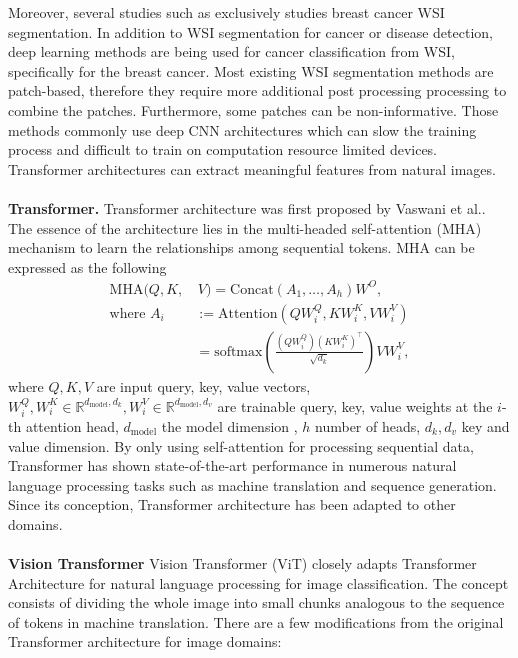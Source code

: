 \documentclass[review]{cvpr}
\begin{document}
Moreover, several studies such as \cite{Guofast2020} exclusively studies breast cancer WSI segmentation. In addition to WSI segmentation for cancer or disease detection, deep learning methods are being used for cancer classification from WSI\cite{XU2014591}, specifically for the  breast cancer. Most existing WSI segmentation methods are patch-based, therefore they require more additional post processing processing to combine the patches. Furthermore, some patches can be non-informative. Those methods commonly use deep CNN architectures which can slow the training process and difficult to train on computation resource limited devices. Transformer architectures can extract meaningful features from natural images. \\
\\
\textbf{Transformer.} Transformer architecture was first proposed by Vaswani et al.\cite{vaswani2017attention}. The essence of the architecture lies in the multi-headed self-attention (MHA) mechanism to learn the relationships among sequential tokens. MHA can be expressed as the following
\begin{equation}
\begin{split}
    \text{MHA}(Q, K,&\, V) =  \text{Concat}(A_1, \dots, A_h)W^O, \\[3mm]
    \text{where } A_i & := \text{Attention}(QW_i^Q, KW_i^K, VW_i^V) \\
        & = \text{softmax} \left( \frac{(QW_i^Q)(KW_i^K)^\top}{\sqrt{d_k}} \right) VW_i^V,
    \label{attention}
\end{split}
\end{equation}
where $Q, K, V$ are input query, key, value vectors, $W_i^Q, W_i^K \in \mathbb{R}^{d_{\text{model}}, d_k}, W_i^V \in \mathbb{R}^{d_{\text{model}}, d_v}$ are trainable query, key, value weights at the $i$-th attention head, $d_{\text{model}}$ the model dimension , $h$ number of heads, $d_k, d_v$ key and value dimension. By only using self-attention for processing sequential data, Transformer has shown state-of-the-art performance in numerous natural language processing tasks such as machine translation and sequence generation. Since its conception, Transformer architecture has been adapted to other domains.\\
\\
\textbf{Vision Transformer} Vision Transformer (ViT)\cite{dosovitskiy2020image} closely adapts Transformer Architecture for natural language processing for image classification. The concept consists of dividing the whole image into small chunks analogous to the sequence of tokens in machine translation. There are a few modifications from the original Transformer architecture for image domains:
\end{document}
